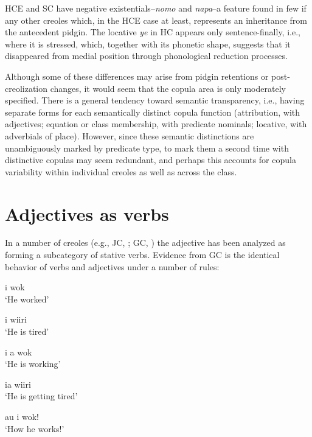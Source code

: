 \z

\z
HCE and SC have negative existentials--\textit{nomo} and \textit{napa}--a feature found in few if any other creoles which, in the HCE case at least, represents an inheritance from the antecedent pidgin. The locative \textit{ye} in HC appears only sentence-finally, i.e., where it is stressed, which, together with its phonetic shape, suggests that it disappeared from medial position through phonological reduction processes.


Although some of these differences may arise from pidgin retentions or post-creolization changes, it would seem that the copula area is only moderately specified. There is a general tendency toward semantic transparency, i.e., having separate forms for each semantically distinct copula function (attribution, with adjectives; equation or class membership, with predicate nominals; locative, with adverbials of place). However, since these semantic distinctions are unambiguously marked by predicate type, to mark them a second time with distinc\-tive copulas may seem redundant, and perhaps this accounts for copula variability within individual creoles as well as across the class.

\section{Adjectives as verbs}

In a number of creoles (e.g., JC, \citealt{Bailey1966}; GC, \citealt{Bickerton1973a}) the adjective has been analyzed as forming a subcategory of stative verbs. Evidence from GC is the identical behavior of verbs and adjectives under a number of rules:

\ea\label{ex:2:63}
 {i} {wok}\\
\glt `He worked'
\z

\ea\label{ex:2:64}
 i wiiri\\
\glt `He is tired'
\z

\ea\label{ex:2:65}
i a wok\\
\glt `He is working'
\z

\ea\label{ex:2:66}
ia {wiiri}\\
\glt `He is getting tired'
\z

\ea\label{ex:2:67}
au i wok!\\
\glt `How he works!'
\z

